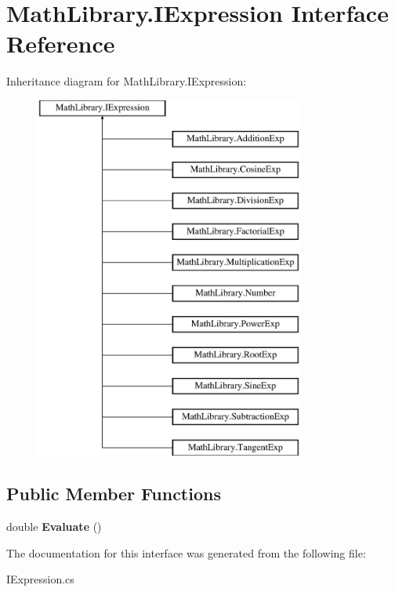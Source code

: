 \hypertarget{interface_math_library_1_1_i_expression}{}\section{Math\+Library.\+I\+Expression Interface Reference}
\label{interface_math_library_1_1_i_expression}
Inheritance diagram for Math\+Library.\+I\+Expression\+:\begin{figure}[H]
\begin{center}
\leavevmode
\includegraphics[height=12.000000cm]{interface_math_library_1_1_i_expression}
\end{center}
\end{figure}
\subsection*{Public Member Functions}
\begin{DoxyCompactItemize}
\item 
\mbox{\label{interface_math_library_1_1_i_expression_aaea3227766d1f9159438d3d1a1fc2f55}} 
double {\bfseries Evaluate} ()
\end{DoxyCompactItemize}


The documentation for this interface was generated from the following file\+:\begin{DoxyCompactItemize}
\item 
I\+Expression.\+cs\end{DoxyCompactItemize}
